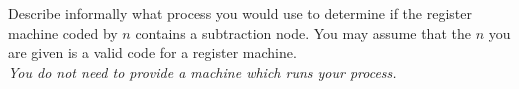 \begin{problem}
  Describe informally what process you would use to determine
  if the register machine coded by $n$ contains a subtraction node.
  You may assume that the $n$ you are given is a valid code
  for a register machine. \\
  \emph{You do not need to provide a machine which runs your process.}

  \begin{answer}
    
  \end{answer}
\end{problem}
